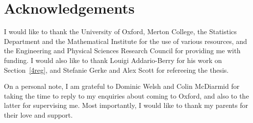 \documentclass{article}
\newtheorem{Proof of Theorem}{Proof of Theorem}
\begin{document}
\newpage
\section*{Acknowledgements}





I would like to thank the University of Oxford, Merton College, the Statistics Department and the Mathematical Institute
for the use of various resources,
and the Engineering and Physical Sciences Research Council for providing me with funding.
I would also like to thank Louigi Addario-Berry for his work on Section~\ref{4reg},
and Stefanie Gerke and Alex Scott for refereeing the thesis.

On a personal note,
I am grateful to Dominic Welsh and Colin McDiarmid for taking the time to reply 
to my enquiries about coming to Oxford,
and also to the latter for supervising me.
Most importantly,
I would like to thank my parents for their love and support.













































\newpage

\begin{displaymath}
\end{displaymath} \\

\phantom{p} 

\tableofcontents
\end{document}
